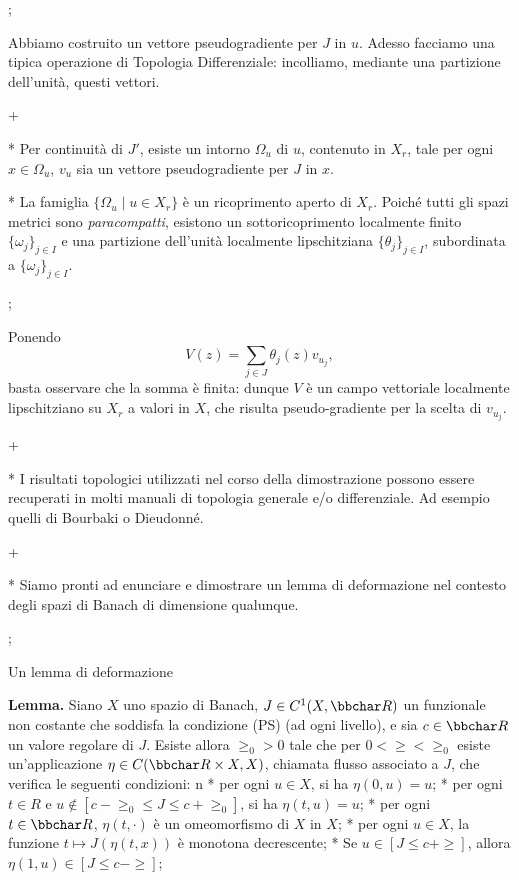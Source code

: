 \pg;

Abbiamo costruito un vettore pseudogradiente per $J$ in $u$. Adesso
facciamo una tipica operazione di Topologia Differenziale: incolliamo,
mediante una partizione dell'unit\`a, questi vettori.

\pg+

* Per continuit\`a di $J'$, esiste un intorno $\Omega_u$ di $u$,
  contenuto in $X_r$, tale per ogni $x \in \Omega_u$, $v_u$ sia un
  vettore pseudogradiente per $J$ in $x$.

* La famiglia $\{\Omega_u \mid u \in X_r\}$ \`e un ricoprimento aperto
  di $X_r$. Poich\'e tutti gli spazi metrici sono {\em paracompatti},
  esistono un sottoricoprimento localmente finito $\{\omega_j\}_{j \in
  I}$ e una partizione dell'unit\`a localmente lipschitziana
  $\{\theta_j\}_{j \in I}$, subordinata a $\{\omega_j\}_{j \in I}$.

\pg;

Ponendo
$$
V(z) = \sum_{j \in J} \theta_j(z) v_{u_j},
$$
basta osservare che la somma \`e finita: dunque $V$ \`e un campo
vettoriale localmente lipschitziano su $X_r$ a valori in $X$, che
risulta pseudo-gradiente per la scelta di $v_{u_j}$.

\pg+

* I risultati topologici utilizzati nel corso della dimostrazione
  possono essere recuperati in molti manuali di topologia generale e/o
  differenziale. Ad esempio quelli di Bourbaki o Dieudonn\'e.

\pg+

* Siamo pronti ad enunciare e dimostrare un lemma di deformazione nel
  contesto degli spazi di Banach di dimensione qualunque.

\pg;

\sec Un lemma di deformazione

{\bf Lemma.} Siano $X$ uno spazio di Banach, $J \in C^1(X,\R)$ un
funzionale non costante che soddisfa la condizione (PS) (ad ogni
livello), e sia $c \in \R$ un valore regolare di $J$. Esiste allora
$\ge_0>0$ tale che per $0<\ge<\ge_0$ esiste un'applicazione $\eta \in
C(\R \times X,X)$, chiamata flusso associato a $J$, che verifica le
seguenti condizioni:
\begitems
\style n
* per ogni $u \in X$, si ha $\eta(0,u)=u$;
* per ogni $t \in R$ e $u \notin [c-\ge_0\leq J \leq c+\ge_0]$, si ha
$\eta(t,u) = u$;
* per ogni $t \in \R$, $\eta(t,\cdot)$ \`e un omeomorfismo di $X$ in
$X$;
* per ogni $u \in X$, la funzione $t \mapsto J(\eta(t,x))$ \`e
monotona decrescente;
* Se $u \in [J \leq c+\ge]$, allora $\eta(1,u) \in [J \leq c-\ge]$;
\enditems

